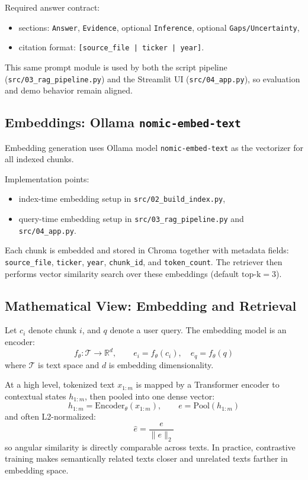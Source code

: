 \documentclass[11pt]{article}
\begin{document}
Required answer contract:
\begin{itemize}
    \item sections: \texttt{Answer}, \texttt{Evidence}, optional \texttt{Inference}, optional \texttt{Gaps/Uncertainty},
    \item citation format: \texttt{[source\_file | ticker | year]}.
\end{itemize}

This same prompt module is used by both the script pipeline (\texttt{src/03\_rag\_pipeline.py}) and the Streamlit UI (\texttt{src/04\_app.py}), so evaluation and demo behavior remain aligned.

\subsection{Embeddings: Ollama \texttt{nomic-embed-text}}
Embedding generation uses Ollama model \texttt{nomic-embed-text} as the vectorizer for all indexed chunks.

Implementation points:
\begin{itemize}
    \item index-time embedding setup in \texttt{src/02\_build\_index.py},
    \item query-time embedding setup in \texttt{src/03\_rag\_pipeline.py} and \texttt{src/04\_app.py}.
\end{itemize}

Each chunk is embedded and stored in Chroma together with metadata fields:
\texttt{source\_file}, \texttt{ticker}, \texttt{year}, \texttt{chunk\_id}, and \texttt{token\_count}. The retriever then performs vector similarity search over these embeddings (default \(\text{top-k}=3\)).

\subsection{Mathematical View: Embedding and Retrieval}
Let \(c_i\) denote chunk \(i\), and \(q\) denote a user query. The embedding model is an encoder:
\[
f_{\theta}: \mathcal{T} \rightarrow \mathbb{R}^{d},
\qquad
e_i = f_{\theta}(c_i), \quad e_q = f_{\theta}(q)
\]
where \(\mathcal{T}\) is text space and \(d\) is embedding dimensionality.

At a high level, tokenized text \(x_{1:m}\) is mapped by a Transformer encoder to contextual states \(h_{1:m}\), then pooled into one dense vector:
\[
h_{1:m} = \mathrm{Encoder}_{\theta}(x_{1:m}), \qquad e = \mathrm{Pool}(h_{1:m})
\]
and often L2-normalized:
\[
\hat{e} = \frac{e}{\|e\|_2}
\]
so angular similarity is directly comparable across texts. In practice, contrastive training makes semantically related texts closer and unrelated texts farther in embedding space.
\end{document}
